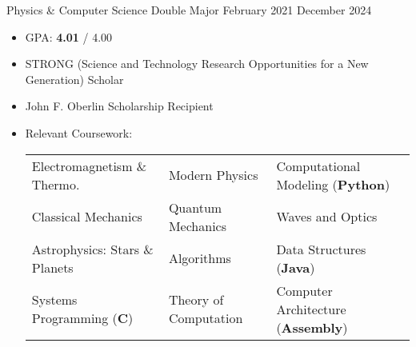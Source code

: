 
\entrySubtitle
	{Physics \& Computer Science Double Major}
	{February 2021}
	{December 2024}

\vspace*{-0.35cm}
\begin{itemize}
	\setlength\itemsep{-0.1cm}
	\item GPA: \textbf{4.01} / 4.00
	
	\item STRONG (Science and Technology Research Opportunities for a New Generation) Scholar

	\item John F. Oberlin Scholarship Recipient
	
	\item Relevant Coursework:
	
		\begin{tabular}{lll}
			Electromagnetism \& Thermo. & Modern Physics & Computational Modeling (\textbf{Python}) \\
			Classical Mechanics & Quantum Mechanics & Waves and Optics \\
			Astrophysics: Stars \& Planets & Algorithms & Data Structures (\textbf{Java}) \\
			Systems Programming (\textbf{C}) & Theory of Computation & Computer Architecture (\textbf{Assembly}) \\
		\end{tabular}
\end{itemize}

